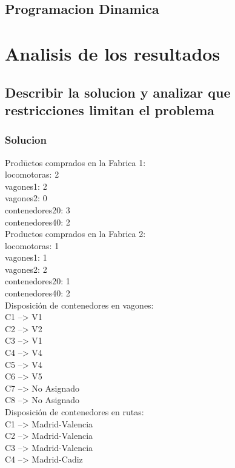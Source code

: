 \documentclass[11pt,spanish]{article}
\begin{document}
		\subsection{Programacion Dinamica}
	\section{Analisis de los resultados}
		\subsection{Describir la solucion y analizar que restricciones limitan el problema}
			\subsubsection{Solucion}
			\begin{tabbing}
			Prod\=uctos comprados en la Fabrica 1:\\
			\>	locomotoras: 2\\
			\>	vagones1: 2\\
			\>	vagones2: 0\\
			\>	contenedores20: 3\\
			\>	contenedores40: 2\\
			Productos comprados en la Fabrica 2:\\
			\>	locomotoras: 1\\
			\>	vagones1: 1\\
			\>	vagones2: 2\\
			\>	contenedores20: 1\\
			\>	contenedores40: 2\\
			Disposición de contenedores en vagones:\\
			\>	C1 --> V1\\
			\>	C2 --> V2\\
			\>	C3 --> V1\\
			\>	C4 --> V4\\
			\>	C5 --> V4\\
			\>	C6 --> V5\\
			\>	C7 --> No Asignado\\
			\>	C8 --> No Asignado\\
			Disposición de contenedores en rutas:\\
			\>	C1 --> Madrid-Valencia\\
			\>	C2 --> Madrid-Valencia\\
			\>	C3 --> Madrid-Valencia\\
			\>	C4 --> Madrid-Cadiz\\

\end{tabbing}
\end{document}
